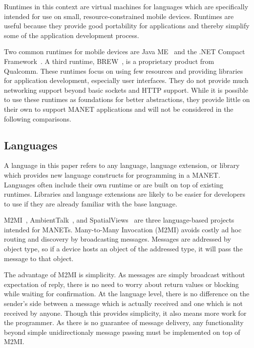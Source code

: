 \documentclass{sig-alternate}
\begin{document}
Runtimes in this context are virtual machines for languages which are specifically intended for use on small, resource-constrained mobile devices. Runtimes are useful because they provide good portability for applications and thereby simplify some of the application development process.

Two common runtimes for mobile devices are Java ME~\cite{javame} and the .NET Compact Framework~\cite{dotnetcf}. A third runtime, BREW~\cite{brew}, is a proprietary product from Qualcomm. These runtimes focus on using few resources and providing libraries for application development, especially user interfaces. They do not provide much networking support beyond basic sockets and HTTP support. While it is possible to use these runtimes as foundations for better abstractions, they provide little on their own to support MANET applications and will not be considered in the following comparisons.

\subsection{Languages}

A language in this paper refers to any language, language extension, or library which provides new language constructs for programming in a MANET. Languages often include their own runtime or are built on top of existing runtimes. Libraries and language extensions are likely to be easier for developers to use if they are already familiar with the base language.

M2MI~\cite{m2mi}, AmbientTalk~\cite{at1}, and SpatialViews~\cite{nisv} are three language-based projects intended for MANETs. Many-to-Many Invocation (M2MI) avoids costly ad hoc routing and discovery by broadcasting messages. Messages are addressed by object type, so if a device hosts an object of the addressed type, it will pass the message to that object.

The advantage of M2MI is simplicity. As messages are simply broadcast without expectation of reply, there is no need to worry about return values or blocking while waiting for confirmation. At the language level, there is no difference on the sender's side between a message which is actually received and one which is not received by anyone. Though this provides simplicity, it also means more work for the programmer. As there is no guarantee of message delivery, any functionality beyond simple unidirectionaly message passing must be implemented on top of M2MI.
\end{document}
